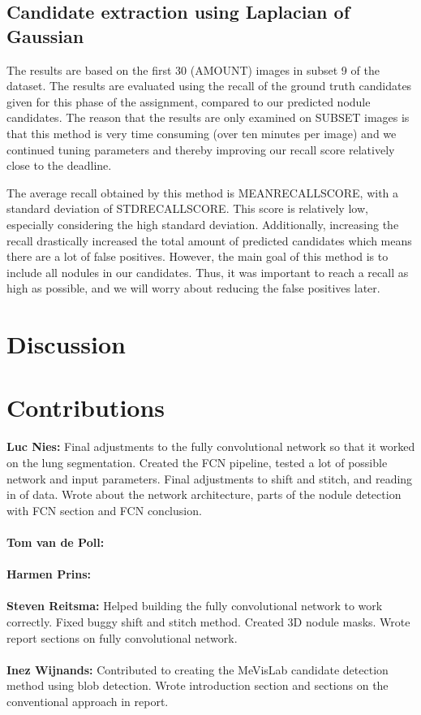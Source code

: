 \documentclass{article}
\begin{document}
\subsection{Candidate extraction using Laplacian of Gaussian}
The results are based on the first 30 (AMOUNT) images in subset 9 of the dataset. The results are evaluated using the recall of the ground truth candidates given for this phase of the assignment, compared to our predicted nodule candidates. The reason that the results are only examined on SUBSET images is that this method is very time consuming (over ten minutes per image) and we continued tuning parameters and thereby improving our recall score relatively close to the deadline.

The average recall obtained by this method is MEANRECALLSCORE, with a standard deviation of STDRECALLSCORE. This score is relatively low, especially considering the high standard deviation. Additionally, increasing the recall drastically increased the total amount of predicted candidates which means there are a lot of false positives. However, the main goal of this method is to include all nodules in our candidates. Thus, it was important to reach a recall as high as possible, and we will worry about reducing the false positives later.

\section{Discussion}\label{sec:discussion}


\appendix
\section{Contributions}
\textbf{Luc Nies:} Final adjustments to the fully convolutional network so that it worked on the lung segmentation. Created the FCN pipeline, tested a lot of possible network and input parameters. Final adjustments to shift and stitch, and reading in of data. Wrote about the network architecture, parts of the nodule detection with FCN section and FCN conclusion.\\
\\
\textbf{Tom van de Poll:} \\
\\
\textbf{Harmen Prins:} \\
\\
\textbf{Steven Reitsma:} Helped building the fully convolutional network to work correctly. Fixed buggy shift and stitch method. Created 3D nodule masks. Wrote report sections on fully convolutional network. \\
\\
\textbf{Inez Wijnands:} Contributed to creating the MeVisLab candidate detection method using blob detection. Wrote introduction section and sections on the conventional approach in report.
\end{document}
